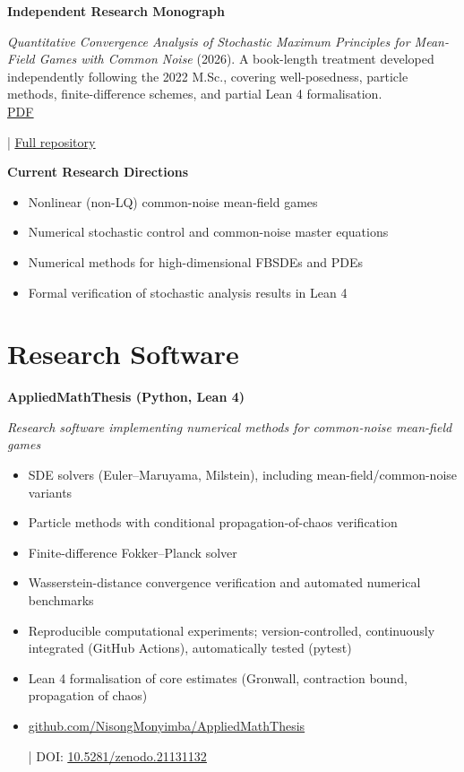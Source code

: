 \documentclass[10.5pt]{article}
\newcommand{\linkbadge}[2]{%
  \href{#1}{\underline{#2}}%
}
\newcommand{\cventry}[2]{%
  \par\noindent\textbf{#1}\hfill\makebox[1.4in][r]{#2}\par
}
\newcommand{\cvsub}[1]{%
  \par\noindent\textit{#1}\par\vspace{2pt}
}
\begin{document}
\vspace{2pt}
\noindent\textbf{Independent Research Monograph}

\vspace{2pt}
\noindent\textit{Quantitative Convergence Analysis of Stochastic Maximum Principles for Mean-Field Games with
Common Noise} (2026). A book-length treatment developed independently following the 2022 M.Sc., covering
well-posedness, particle methods, finite-difference schemes, and partial Lean 4 formalisation.\\
\linkbadge{https://github.com/NisongMonyimba/AppliedMathThesis/blob/main/manuscript/main.pdf}{PDF}
\;|\;
\linkbadge{https://github.com/NisongMonyimba/AppliedMathThesis}{Full repository}

\vspace{2pt}
\noindent\textbf{Current Research Directions}
\begin{itemize}
  \item Nonlinear (non-LQ) common-noise mean-field games
  \item Numerical stochastic control and common-noise master equations
  \item Numerical methods for high-dimensional FBSDEs and PDEs
  \item Formal verification of stochastic analysis results in Lean 4
\end{itemize}

\section*{Research Software}

\cventry{AppliedMathThesis (Python, Lean 4)}{}
\cvsub{Research software implementing numerical methods for common-noise mean-field games}
\begin{itemize}
  \item SDE solvers (Euler--Maruyama, Milstein), including mean-field/common-noise variants
  \item Particle methods with conditional propagation-of-chaos verification
  \item Finite-difference Fokker--Planck solver
  \item Wasserstein-distance convergence verification and automated numerical benchmarks
  \item Reproducible computational experiments; version-controlled, continuously integrated (GitHub Actions), automatically tested (pytest)
  \item Lean 4 formalisation of core estimates (Gronwall, contraction bound, propagation of chaos)
  \item \linkbadge{https://github.com/NisongMonyimba/AppliedMathThesis}{github.com/NisongMonyimba/AppliedMathThesis}
  \;|\; DOI: \linkbadge{https://doi.org/10.5281/zenodo.21131132}{10.5281/zenodo.21131132}
\end{itemize}
\end{document}
